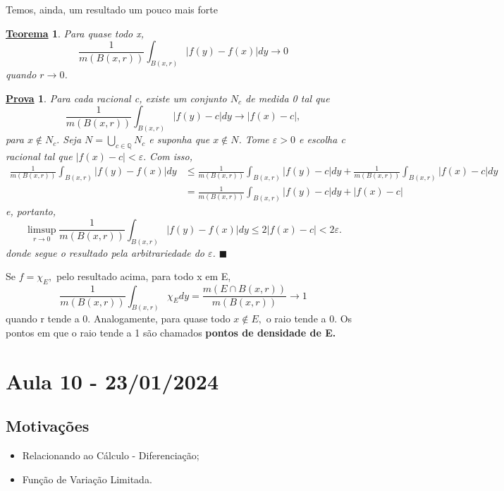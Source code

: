 \documentclass{article}
\newtheorem*{theorem*}{\underline{Teorema}}
\newtheorem*{proof*}{\underline{Prova}}
\renewcommand\qedsymbol{$\blacksquare$}
\begin{document}
  Temos, ainda, um resultado um pouco mais forte
 \begin{theorem*}
   Para quase todo x, 
     \[
       \frac{1}{m(B(x, r))}\int_{B(x, r)}^{}|f(y) - f(x)|dy\to 0
     \]
  quando \(r\to 0\).
 \end{theorem*}
\begin{proof*}
  Para cada racional c, existe um conjunto \(N_{c}\) de medida 0 tal que 
    \[
      \frac{1}{m(B(x, r))}\int_{B(x, r)}^{}|f(y)-c|dy\to |f(x)-c|,
    \]
para \(x\not\in N_{c}.\) Seja \(N = \bigcup_{c\in \mathbb{Q}}^{}N_{c}\) e suponha que \(x\not\in N\). Tome \(\varepsilon > 0\) e escolha c racional tal que \(|f(x) - c| < \varepsilon .\)
Com isso, 
 \begin{align*}
   \frac{1}{m(B(x, r))}\int_{B(x, r)}^{}|f(y) - f(x)|dy &\leq \frac{1}{m(B(x, r))}\int_{B(x, r)}^{}|f(y)-c|dy + \frac{1}{m(B(x, r))}\int_{B(x, r)}^{}|f(x)-c|dy\\ 
                                                        &= \frac{1}{m(B(x, r))}\int_{B(x, r)}^{}|f(y)-c|dy + |f(x) - c|
 \end{align*}
e, portanto, 
  \[
    \limsup_{r\to 0}\frac{1}{m(B(x, r))}\int_{B(x, r)}^{}|f(y) - f(x)|dy \leq 2|f(x)-c|< 2\varepsilon.
  \]
donde segue o resultado pela arbitrariedade do \(\varepsilon \). \qedsymbol
\end{proof*}
 Se \(f = \chi_{E},\) pelo resultado acima, para todo x em E, 
   \[
     \frac{1}{m(B(x, r))}\int_{B(x, r)}^{}\chi_{E}dy = \frac{m(E\cap B(x, r))}{m(B(x, r))}\to 1
   \]
quando r tende a 0. Analogamente, para quase todo \(x\not\in E,\) o raio tende a 0. Os pontos em que o raio tende a 1 são chamados \textbf{pontos de densidade de E.}
\newpage

\section{Aula 10 - 23/01/2024}
\subsection{Motivações}
\begin{itemize}
  \item Relacionando ao Cálculo - Diferenciação;
  \item Função de Variação Limitada.
\end{itemize}
\end{document}
